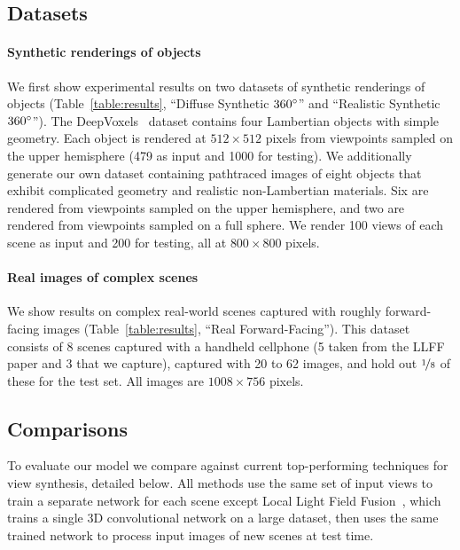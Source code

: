 \documentclass[runningheads]{llncs}
\begin{document}
\subsection{Datasets}

\paragraph{\textbf{Synthetic renderings of objects}}
\label{subsec:goodsynth}

We first show experimental results on two datasets of synthetic renderings of objects (Table~\ref{table:results}, ``Diffuse Synthetic $360\degree$'' and ``Realistic Synthetic $360\degree$''). The DeepVoxels~\cite{deepvoxels} dataset contains four Lambertian objects with simple geometry. Each object is rendered at $512\times 512$ pixels from viewpoints sampled on the upper hemisphere (479 as input and 1000 for testing). We additionally generate our own dataset containing pathtraced images of eight objects that exhibit complicated geometry and realistic non-Lambertian materials. Six are rendered from viewpoints sampled on the upper hemisphere, and two are rendered from viewpoints sampled on a full sphere. We render 100 views of each scene as input and 200 for testing, all at $800\times 800$ pixels.





\paragraph{\textbf{Real images of complex scenes}}

We show results on complex real-world scenes captured with roughly forward-facing images (Table~\ref{table:results}, ``Real Forward-Facing''). This dataset consists of 8 scenes captured with a handheld cellphone (5 taken from the LLFF paper and 3 that we capture), captured with 20 to 62 images, and hold out $\nicefrac{1}{8}$ of these for the test set. All images are $1008 \times 756$ pixels.











\subsection{Comparisons}

To evaluate our model we compare against current top-performing techniques for view synthesis, detailed below. All methods use the same set of input views to train a separate network for each scene except Local Light Field Fusion~\cite{mildenhall19}, which trains a single 3D convolutional network on a large dataset, then uses the same trained network to process input images of new scenes at test time. 
\end{document}
